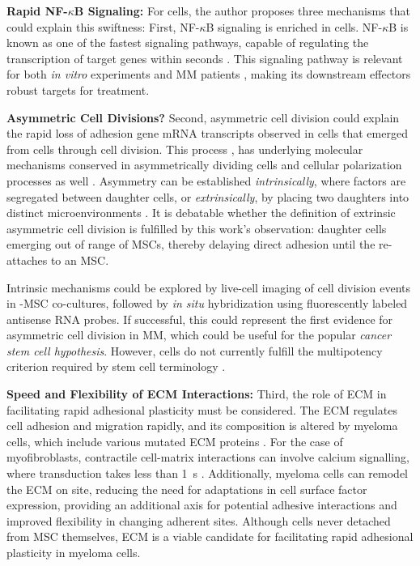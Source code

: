 \textbf{Rapid NF-$\kappa$B Signaling:}
For \INA cells, the author proposes three mechanisms that could explain this
swiftness: First, NF-$\kappa$B signaling is enriched in \MAina cells.
NF-$\kappa$B is known as one of the fastest signaling pathways, capable of
regulating the transcription of target genes within seconds
\cite{gallego-sellesFastRegulationNFkB2022,
      zarnegarNoncanonicalNFkBActivation2008}. This signaling pathway is relevant for
both \textit{in vitro} experiments and MM patients
\cite{sarinEvaluatingEfficacyMultiple2020}, making its downstream effectors
robust targets for treatment.

\textbf{Asymmetric Cell Divisions?}
Second, asymmetric cell division could explain the rapid loss of adhesion gene
mRNA transcripts observed in \nMAina cells that emerged from \MAina cells
through cell division. This process , has
underlying molecular mechanisms conserved in asymmetrically dividing
cells and cellular polarization processes as well \cite{inabaAsymmetricStemCell2012,
      stjohnstonCellPolarityEggs2010}. Asymmetry can be established
\emph{intrinsically}, where factors are segregated between daughter cells, or
\emph{extrinsically}, by placing two daughters into distinct microenvironments
\cite{inabaAsymmetricStemCell2012}. It is debatable whether the definition of
extrinsic asymmetric cell division is fulfilled by this work's observation:
\nMAina daughter cells emerging out of range of \acp{MSC}, thereby delaying
direct adhesion until the \nMAina re-attaches to an \ac{MSC}.

Intrinsic mechanisms could be explored by live-cell imaging of cell division
events in \INA-\ac{MSC} co-cultures, followed by \textit{in situ} hybridization
using fluorescently labeled antisense RNA probes. If successful, this could
represent the first evidence for asymmetric cell division in MM, which could be
useful for the popular \emph{cancer stem cell hypothesis}. However, \MAina cells
do not currently fulfill the multipotency criterion required by stem cell
terminology \cite{johnsenMyelomaStemCell2016, liAsymmetricCellDivision2022}.

\textbf{Speed and Flexibility of ECM Interactions:}
Third, the role of \ac{ECM} in facilitating rapid adhesional plasticity must be
considered. The \ac{ECM} regulates cell adhesion and migration rapidly, and its
composition is altered by myeloma cells, which include various mutated \ac{ECM}
proteins \cite{ibraheemBMMSCsderivedECMModifies2019,
      eversPrognosticValueExtracellular2023}. For the case of myofibroblasts,
contractile cell-matrix interactions can involve calcium signalling, where
transduction takes less than \SI{1}{\second} \cite{yamadaCell3DMatrix2022}.
Additionally, myeloma cells can remodel the \ac{ECM} on site, reducing the need
for adaptations in cell surface factor expression, providing an additional axis
for potential adhesive interactions and improved flexibility in changing
adherent sites. Although \MAina cells never detached from \ac{MSC} themselves,
\ac{ECM} is a viable candidate for facilitating rapid adhesional plasticity in
myeloma cells.




